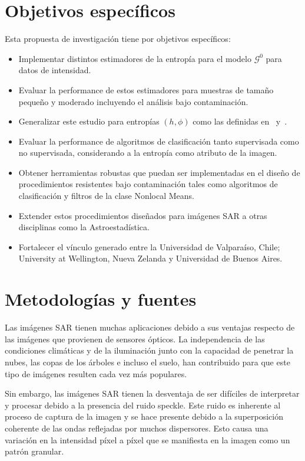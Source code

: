 \documentclass[11pt]{article}
\begin{document}
\section{Objetivos específicos}

Esta propuesta de investigación tiene por objetivos específicos:
\begin{itemize}
	\item Implementar distintos estimadores de la entropía para el modelo $\mathcal{G}^0$ para datos de intensidad.
	\item Evaluar la performance de estos estimadores para muestras de tamaño pequeño y moderado incluyendo el análisis bajo contaminación.
	\item Generalizar este estudio para entropías $(h,\phi)$ como las definidas en~\cite{Menendez1997} y~\cite{Salicru1994}. 
	\item Evaluar la performance de algoritmos de clasificación tanto supervisada como no supervisada, considerando a la entropía como atributo de la imagen.
	\item Obtener herramientas robustas que puedan ser implementadas en el diseño de procedimientos resistentes bajo contaminación tales como algoritmos de clasificación y filtros de la clase Nonlocal Means.
	\item Extender estos procedimientos diseñados para imágenes SAR a otras disciplinas como la Astroestadística.
	\item Fortalecer el vínculo generado entre la Universidad de Valparaíso, Chile; University at Wellington, Nueva Zelanda y Universidad de Buenos Aires.
\end{itemize}

\section{Metodologías y fuentes}

Las imágenes SAR tienen muchas aplicaciones debido a sus ventajas respecto de las imágenes que provienen de sensores ópticos. La independencia de las condiciones climáticas y de la iluminación junto con la capacidad de penetrar la nubes, las copas de los árboles e incluso el suelo, han contribuido para que este tipo de imágenes resulten cada vez más populares.

Sin embargo, las imágenes SAR tienen la desventaja de ser difíciles de interpretar y procesar debido a la presencia del ruido speckle. Este ruido es inherente al proceso de captura de la imagen y se hace presente debido a la superposición coherente de las ondas reflejadas por muchos dispersores. Esto causa una variación en la intensidad píxel a píxel que se manifiesta en la imagen como un patrón granular. 
\end{document}
